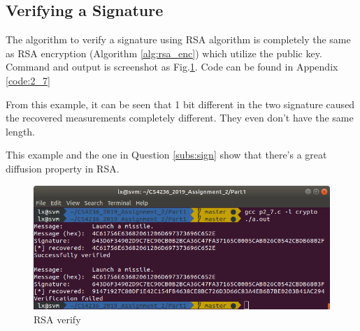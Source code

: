 \subsection{Verifying a Signature}

The algorithm to verify a signature using RSA algorithm is completely the same as RSA encryption (Algorithm \ref{alg:rsa_enc}) which utilize the public key.
Command and output is screenshot as Fig.\ref{fig:p2_7}.
Code can be found in Appendix \ref{code:2_7}

From this example, it can be seen that 1 bit different in the two signature caused the recovered measurements completely different. They even don't have the same length.

This example and the one in Question \ref{subs:sign} show that there's a great diffusion property in RSA.

\begin{figure}[ht]
\centering
\includegraphics[width=\columnwidth]{pictures/p2_7.png}
\caption{
    RSA verify
}
\label{fig:p2_7}
\end{figure}